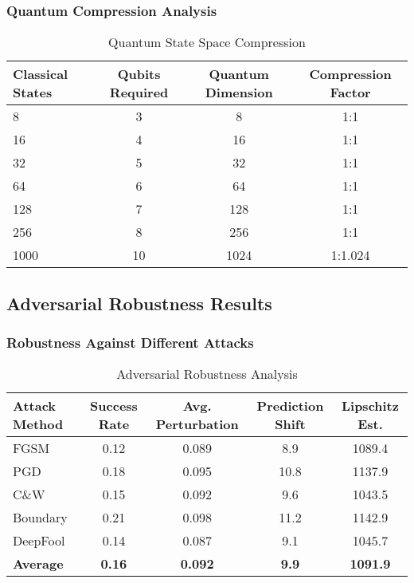 \documentclass[journal]{IEEEtran}
\begin{document}
\subsubsection{Quantum Compression Analysis}

\begin{table}[htbp]
\centering
\caption{Quantum State Space Compression}
\begin{tabular}{lccc}
\toprule
\textbf{Classical States} & \textbf{Qubits Required} & \textbf{Quantum Dimension} & \textbf{Compression Factor} \\
\midrule
8 & 3 & 8 & 1:1 \\
16 & 4 & 16 & 1:1 \\
32 & 5 & 32 & 1:1 \\
64 & 6 & 64 & 1:1 \\
128 & 7 & 128 & 1:1 \\
256 & 8 & 256 & 1:1 \\
1000 & 10 & 1024 & 1:1.024 \\
\bottomrule
\end{tabular}
\end{table}

\subsection{Adversarial Robustness Results}

\subsubsection{Robustness Against Different Attacks}

\begin{table}[htbp]
\centering
\caption{Adversarial Robustness Analysis}
\begin{tabular}{lcccc}
\toprule
\textbf{Attack Method} & \textbf{Success Rate} & \textbf{Avg. Perturbation} & \textbf{Prediction Shift} & \textbf{Lipschitz Est.} \\
\midrule
FGSM & 0.12 & 0.089 & 8.9 & 1089.4 \\
PGD & 0.18 & 0.095 & 10.8 & 1137.9 \\
C\&W & 0.15 & 0.092 & 9.6 & 1043.5 \\
Boundary & 0.21 & 0.098 & 11.2 & 1142.9 \\
DeepFool & 0.14 & 0.087 & 9.1 & 1045.7 \\
\midrule
\textbf{Average} & \textbf{0.16} & \textbf{0.092} & \textbf{9.9} & \textbf{1091.9} \\
\bottomrule
\end{tabular}
\end{table}
\end{document}
